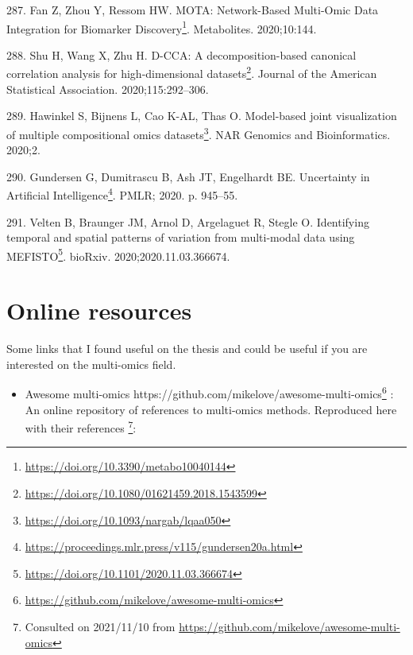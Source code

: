 \documentclass[
  12pt,
  a4paper,
  twoside,
  openright]{book}
\DeclareRobustCommand{\href}[2]{#2\footnote{\url{#1}}}
\providecommand{\tightlist}{%
  \setlength{\itemsep}{0pt}\setlength{\parskip}{0pt}}
\newlength{\cslhangindent}
\newlength{\cslentryspacingunit} %
\newenvironment{CSLReferences}[2] %
 {%
  \setlength{\parindent}{0pt}
  \ifodd #1
  \let\oldpar\par
  \def\par{\hangindent=\cslhangindent\oldpar}
  \fi
  \setlength{\parskip}{#2\cslentryspacingunit}
 }%
 {}
\begin{document}
\begin{CSLReferences}{0}{0}
\leavevmode{}%
287. Fan Z, Zhou Y, Ressom HW. \href{https://doi.org/10.3390/metabo10040144}{MOTA: Network-Based Multi-Omic Data Integration for Biomarker Discovery}. Metabolites. 2020;10:144.

\leavevmode{}%
288. Shu H, Wang X, Zhu H. \href{https://doi.org/10.1080/01621459.2018.1543599}{D-CCA: A decomposition-based canonical correlation analysis for high-dimensional datasets}. Journal of the American Statistical Association. 2020;115:292--306.

\leavevmode{}%
289. Hawinkel S, Bijnens L, Cao K-AL, Thas O. \href{https://doi.org/10.1093/nargab/lqaa050}{Model-based joint visualization of multiple compositional omics datasets}. NAR Genomics and Bioinformatics. 2020;2.

\leavevmode{}%
290. Gundersen G, Dumitrascu B, Ash JT, Engelhardt BE. \href{https://proceedings.mlr.press/v115/gundersen20a.html}{Uncertainty in Artificial Intelligence}. PMLR; 2020. p. 945--55.

\leavevmode{}%
291. Velten B, Braunger JM, Arnol D, Argelaguet R, Stegle O. \href{https://doi.org/10.1101/2020.11.03.366674}{Identifying temporal and spatial patterns of variation from multi-modal data using MEFISTO}. bioRxiv. 2020;2020.11.03.366674.

\end{CSLReferences}

\hypertarget{appendix-appendix}{%
\appendix {}}


\hypertarget{online-resources}{%
\chapter{Online resources}\label{online-resources}}

Some links that I found useful on the thesis and could be useful if you are interested on the multi-omics field.

\begin{itemize}
\tightlist
\item
  \href{https://github.com/mikelove/awesome-multi-omics}{Awesome multi-omics https://github.com/mikelove/awesome-multi-omics} : An online repository of references to multi-omics methods. Reproduced here with their references \footnote{Consulted on 2021/11/10 from \url{https://github.com/mikelove/awesome-multi-omics}}:
\end{itemize}
\end{document}
